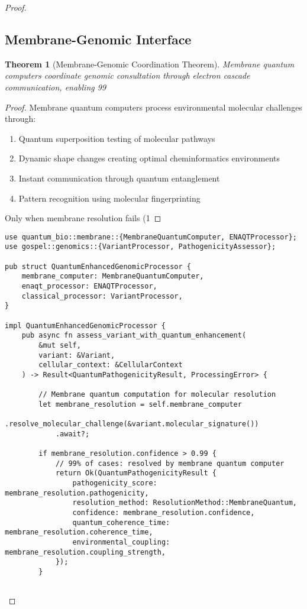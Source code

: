 \documentclass[12pt,a4paper]{article}
\newtheorem{theorem}{Theorem}[section]
\begin{document}
\begin{proof}
\subsection{Membrane-Genomic Interface}

\begin{theorem}[Membrane-Genomic Coordination Theorem]
Membrane quantum computers coordinate genomic consultation through electron cascade communication, enabling 99%
\end{theorem}

\begin{proof}
Membrane quantum computers process environmental molecular challenges through:
\begin{enumerate}
\item Quantum superposition testing of molecular pathways
\item Dynamic shape changes creating optimal cheminformatics environments
\item Instant communication through quantum entanglement
\item Pattern recognition using molecular fingerprinting
\end{enumerate}

Only when membrane resolution fails (1%
\end{proof}

\begin{lstlisting}[style=ruststyle, caption=Quantum-Enhanced Genomic Processing]
use quantum_bio::membrane::{MembraneQuantumComputer, ENAQTProcessor};
use gospel::genomics::{VariantProcessor, PathogenicityAssessor};

pub struct QuantumEnhancedGenomicProcessor {
    membrane_computer: MembraneQuantumComputer,
    enaqt_processor: ENAQTProcessor,
    classical_processor: VariantProcessor,
}

impl QuantumEnhancedGenomicProcessor {
    pub async fn assess_variant_with_quantum_enhancement(
        &mut self,
        variant: &Variant,
        cellular_context: &CellularContext
    ) -> Result<QuantumPathogenicityResult, ProcessingError> {
        
        // Membrane quantum computation for molecular resolution
        let membrane_resolution = self.membrane_computer
            .resolve_molecular_challenge(&variant.molecular_signature())
            .await?;
        
        if membrane_resolution.confidence > 0.99 {
            // 99% of cases: resolved by membrane quantum computer
            return Ok(QuantumPathogenicityResult {
                pathogenicity_score: membrane_resolution.pathogenicity,
                resolution_method: ResolutionMethod::MembraneQuantum,
                confidence: membrane_resolution.confidence,
                quantum_coherence_time: membrane_resolution.coherence_time,
                environmental_coupling: membrane_resolution.coupling_strength,
            });
        }
        

\end{lstlisting}
\end{proof}
\end{document}
